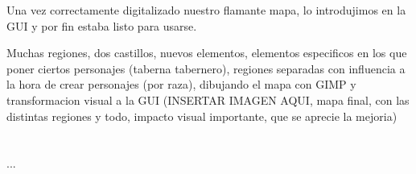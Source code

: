 Una vez correctamente digitalizado nuestro flamante mapa, lo introdujimos en la GUI y por fin estaba listo para usarse.

Muchas regiones, dos castillos, nuevos elementos, elementos especificos en los que poner ciertos personajes (taberna tabernero), regiones separadas con influencia a la hora de crear personajes (por raza), dibujando el mapa con GIMP y transformacion visual a la GUI
(INSERTAR IMAGEN AQUI, mapa final, con las distintas regiones y todo, impacto visual importante, que se aprecie la mejoria)

\section*{\ProximoCapitulo}
\TocProximoCapitulo

...




